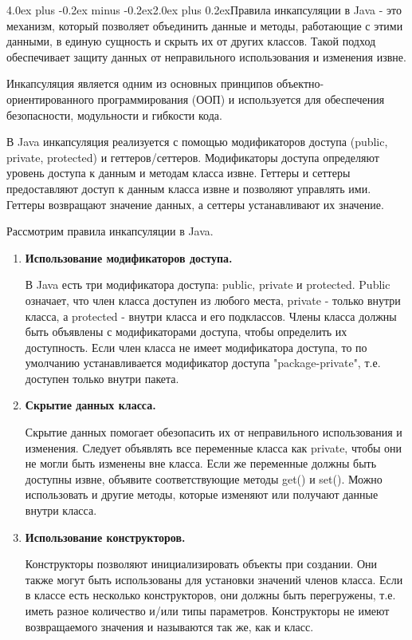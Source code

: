 \documentclass[12pt, a4paper]{book}%
\makeatletter
\renewcommand{\section}{\@startsection{section}{1}{1pt}%
{4.0ex plus -0.2ex minus -0.2ex}{2.0ex plus 0.2ex}{\centering\bf}}%
\makeatother
\begin{document}
{%

\section{Правила инкапсуляции в Java}
{} - это механизм, который позволяет объединить данные и методы, работающие с этими данными, в единую сущность и скрыть их от других классов. Такой подход обеспечивает защиту данных от неправильного использования и изменения извне.

Инкапсуляция является одним из основных принципов объектно-ориентированного программирования (ООП) и используется для обеспечения безопасности, модульности и гибкости кода.

В Java инкапсуляция реализуется с помощью модификаторов доступа (public, private, protected) и геттеров/сеттеров. Модификаторы доступа определяют уровень доступа к данным и методам класса извне. Геттеры и сеттеры предоставляют доступ к данным класса извне и позволяют управлять ими. Геттеры возвращают значение данных, а сеттеры устанавливают их значение.

Рассмотрим правила инкапсуляции в Java.
\begin{enumerate}
\item {\bf Использование модификаторов доступа.}

В Java есть три модификатора доступа: public, private и protected. Public означает, что член класса доступен из любого места, private - только внутри класса, а protected - внутри класса и его подклассов. Члены класса должны быть объявлены с модификаторами доступа, чтобы определить их доступность. Если член класса не имеет модификатора доступа, то по умолчанию устанавливается модификатор доступа "package-private", т.е. доступен только внутри пакета.

\item {\bf Скрытие данных класса.}

Скрытие данных помогает обезопасить их от неправильного использования и изменения. Следует объявлять все переменные класса как private, чтобы они не могли быть изменены вне класса. Если же переменные должны быть доступны извне, объявите соответствующие методы get() и set(). Можно использовать и другие методы, которые изменяют или получают данные внутри класса. 

\item {\bf Использование конструкторов.}

Конструкторы позволяют инициализировать объекты при создании. Они также могут быть использованы для установки значений членов класса. Если в классе есть несколько конструкторов, они должны быть перегружены, т.е. иметь разное количество и/или типы параметров. Конструкторы не имеют возвращаемого значения и называются так же, как и класс.


\end{enumerate}}
\end{document}
